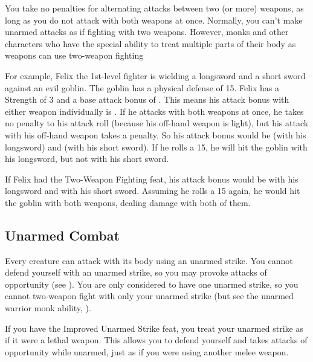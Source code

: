 You take no penalties for alternating attacks between two (or more) weapons, as long as you do not attack with both weapons at once. Normally, you can't make unarmed attacks as if fighting with two weapons. However, monks and other characters who have the special ability to treat multiple parts of their body as weapons can use two-weapon fighting

\par For example, Felix the 1st-level fighter is wielding a longsword and a short sword against an evil goblin. The goblin has a physical defense of 15. Felix has a Strength of 3 and a base attack bonus of . This means his attack bonus with either weapon individually is . If he attacks with both weapons at once, he takes no penalty to his attack roll (because his off-hand weapon is light), but his attack with his off-hand weapon takes a  penalty. So his attack bonus would be  (with his longsword) and  (with his short sword). If he rolls a 15, he will hit the goblin with his longsword, but not with his short sword.

\par If Felix had the Two-Weapon Fighting feat, his attack bonus would be  with his longsword and  with his short sword. Assuming he rolls a 15 again, he would hit the goblin with both weapons, dealing damage with both of them.

\subsection{Unarmed Combat}
Every creature can attack with its body using an unarmed strike. You cannot defend yourself with an unarmed strike, so you may provoke attacks of opportunity (see ). You are only considered to have one unarmed strike, so you cannot two-weapon fight with only your unarmed strike (but see the unarmed warrior monk ability, ).

If you have the Improved Unarmed Strike feat, you treat your unarmed strike as if it were a lethal weapon. This allows you to defend yourself and takes attacks of opportunity while unarmed, just as if you were using another melee weapon.
